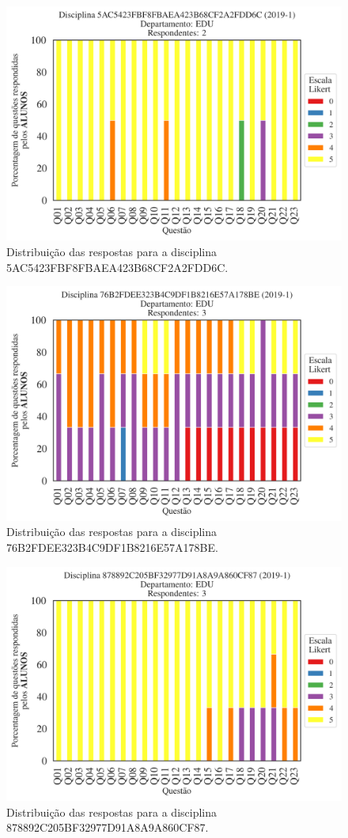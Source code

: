\documentclass[a4paper,10pt]{article}
\begin{document}
\begin{figure}[h]
\centering
\includegraphics[width=0.485\linewidth]{analise_disciplina_departamento_EDU_ALUNO_TURMA_5AC5423FBF8FBAEA423B68CF2A2FDD6C.png}
\caption{\label{fig:analise_geral_departamento}                Distribuição das respostas para a disciplina 5AC5423FBF8FBAEA423B68CF2A2FDD6C.}
\end{figure}
\begin{figure}[h]
\centering
\includegraphics[width=0.485\linewidth]{analise_disciplina_departamento_EDU_ALUNO_TURMA_76B2FDEE323B4C9DF1B8216E57A178BE.png}
\caption{\label{fig:analise_geral_departamento}                Distribuição das respostas para a disciplina 76B2FDEE323B4C9DF1B8216E57A178BE.}
\end{figure}
\begin{figure}[h]
\centering
\includegraphics[width=0.485\linewidth]{analise_disciplina_departamento_EDU_ALUNO_TURMA_878892C205BF32977D91A8A9A860CF87.png}
\caption{\label{fig:analise_geral_departamento}                Distribuição das respostas para a disciplina 878892C205BF32977D91A8A9A860CF87.}
\end{figure}
\end{document}
